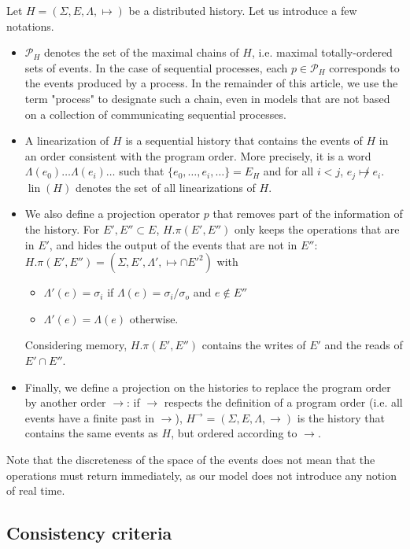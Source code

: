 \documentclass[9pt,numbers]{sigplanconf}
\DeclareMathOperator{\lin}{lin}
\begin{document}
Let $H = (\Sigma, E, \Lambda, \mapsto)$ be a distributed history. Let us introduce a few notations.
\begin{itemize}
\item $\mathscr{P}_H$ denotes the set of the maximal chains of $H$, i.e. maximal totally-ordered sets of events.
  In the case of sequential processes, each $p\in \mathscr{P}_H$ corresponds to the events produced by a process.
  In the remainder of this article, we use the term "process" to designate such a chain, even in models that are not based on a 
  collection of communicating sequential processes.
\item A linearization of $H$ is a sequential history that contains the events of $H$ 
  in an order consistent with the program order. More precisely, it is a word 
  $\Lambda(e_0)\ldots\Lambda(e_i)\ldots$ such that $\{e_0, \ldots, e_i, \ldots\} = E_H$
  and for all $i<j$, $e_j\not\mapsto e_i$.
  $\lin(H)$ denotes the set of all linearizations of $H$.
\item We also define a projection operator $p$ that
  removes part of the information of the history. For $E', E''\subset E$, 
  $H.\pi(E', E'')$ only keeps the operations that are in $E'$, and hides the 
  output of the events that are not in $E''$: 
  $H.\pi(E', E'') = (\Sigma, E', \Lambda', {\mapsto} \cap {E'^2})$
  with 
  \begin{itemize}
  \item $\Lambda'(e) = \sigma_i$ if $\Lambda(e) = \sigma_i/\sigma_o$ and $e\not \in E''$
  \item $\Lambda'(e) = \Lambda(e)$ otherwise.
  \end{itemize}
  Considering memory, $H.\pi(E', E'')$ contains the writes of $E'$ and the reads of $E' \cap E''$.
\item Finally, we define a projection on the histories to replace the program order 
  by another order $\rightarrow$: if $\rightarrow$ respects the 
  definition of a program order (i.e. all events have a finite past in $\rightarrow$), 
  $H^\rightarrow = (\Sigma, E, \Lambda, \rightarrow)$ is the history that contains the same events as 
  $H$, but ordered according to $\rightarrow$.
\end{itemize}

Note that the discreteness of the space of the events does not mean 
that the operations must return immediately, as our model does not 
introduce any notion of real time.

\subsection{Consistency criteria}
\end{document}
